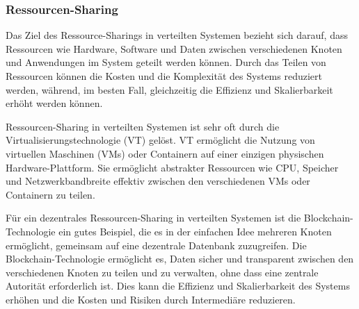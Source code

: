 \documentclass[../vs-script-first-v01.tex]{subfiles}
\begin{document}
\label{Woche01}



\subsubsection{Ressourcen-Sharing}
Das Ziel des Ressource-Sharings in verteilten Systemen bezieht sich darauf, dass Ressourcen wie Hardware, Software und Daten zwischen verschiedenen Knoten und Anwendungen im System geteilt werden können. Durch das Teilen von Ressourcen können die Kosten und die Komplexität des Systems reduziert werden, während, im besten Fall, gleichzeitig die Effizienz und Skalierbarkeit erhöht werden können.

Ressourcen-Sharing in verteilten Systemen ist sehr oft durch die Virtualisierungstechnologie (VT) gelöst. VT ermöglicht die Nutzung von virtuellen Maschinen (VMs) oder Containern auf einer einzigen physischen Hardware-Plattform. Sie ermöglicht abstrakter  Ressourcen wie CPU, Speicher und Netzwerkbandbreite effektiv zwischen den verschiedenen VMs oder Containern zu teilen.

Für ein dezentrales Ressourcen-Sharing in verteilten Systemen ist die Blockchain-Technologie ein gutes Beispiel, die es in der einfachen Idee mehreren Knoten ermöglicht, gemeinsam auf eine dezentrale Datenbank zuzugreifen. Die Blockchain-Technologie ermöglicht es, Daten sicher und transparent zwischen den verschiedenen Knoten zu teilen und zu verwalten, ohne dass eine zentrale Autorität erforderlich ist. Dies kann die Effizienz und Skalierbarkeit des Systems erhöhen und die Kosten und Risiken durch Intermediäre reduzieren.
\end{document}
